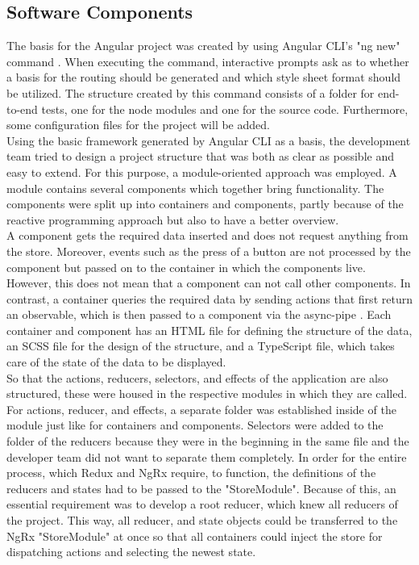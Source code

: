 \documentclass[Bachelor,BIF,english]{twbook}
\begin{document}
\subsection{Software Components}
The basis for the Angular project was created by using Angular CLI's \cite{AngularCli} "ng new" command \cite{AngularCli}. When executing the command, interactive prompts ask as to whether a basis for the routing should be generated and which style sheet format should be utilized. The structure created by this command consists of a folder for end-to-end tests, one for the node modules and one for the source code. Furthermore, some configuration files for the project will be added.
\\[\baselineskip]
Using the basic framework generated by Angular CLI as a basis, the development team tried to design a project structure that was both as clear as possible and easy to extend. For this purpose, a module-oriented approach was employed. A module contains several components which together bring functionality. The components were split up into containers and components, partly because of the reactive programming approach but also to have a better overview.
\\[\baselineskip]
A component gets the required data inserted and does not request anything from the store. Moreover, events such as the press of a button are not processed by the component but passed on to the container in which the components live. However, this does not mean that a component can not call other components. In contrast, a container queries the required data by sending actions that first return an observable, which is then passed to a component via the async-pipe \cite{AngularAsyncPipe}. Each container and component has an HTML file for defining the structure of the data, an SCSS \cite{Sass} file for the design of the structure, and a TypeScript file, which takes care of the state of the data to be displayed.
\\[\baselineskip]
So that the actions, reducers, selectors, and effects of the application are also structured, these were housed in the respective modules in which they are called. For actions, reducer, and effects, a separate folder was established inside of the module just like for containers and components. Selectors were added to the folder of the reducers because they were in the beginning in the same file and the developer team did not want to separate them completely. In order for the entire process, which Redux and NgRx require, to function, the definitions of the reducers and states had to be passed to the "StoreModule". Because of this, an essential requirement was to develop a root reducer, which knew all reducers of the project. This way, all reducer, and state objects could be transferred to the NgRx "StoreModule" at once so that all containers could inject the store for dispatching actions and selecting the newest state.
\end{document}
